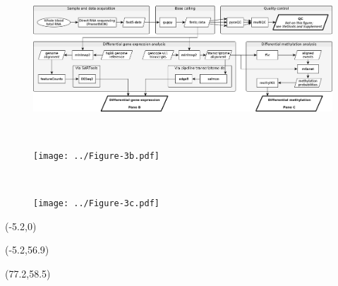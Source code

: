 \documentclass{article}
\begin{document}
\begin{samepage}

\begin{figure}[H]
    \includegraphics[width=.963\textwidth,keepaspectratio,right]{flowchart-yEd.png}
\end{figure}

\vspace{-.85cm}

\begin{figure}[H] \centering
    \begin{minipage}{.01511\textwidth}
        ~
    \end{minipage}
    \begin{minipage}{.484\textwidth}
        \vspace{2mm}
        \texttt{[image: ../Figure-3b.pdf]}
    \end{minipage}
    \begin{minipage}{.005\textwidth}
        ~
    \end{minipage}
    \begin{minipage}{.482\textwidth}
        \texttt{[image: ../Figure-3c.pdf]}
    \end{minipage}
\end{figure}

\begin{textblock}{0}(-5.2,0)\fontsize{24pt}{30pt}\selectfont{a}\end{textblock}
\begin{textblock}{0}(-5.2,56.9)\fontsize{24pt}{30pt}\selectfont{b}\end{textblock}
\begin{textblock}{0}(77.2,58.5)\fontsize{24pt}{30pt}\selectfont{c}\end{textblock}

\end{samepage}
\end{document}
